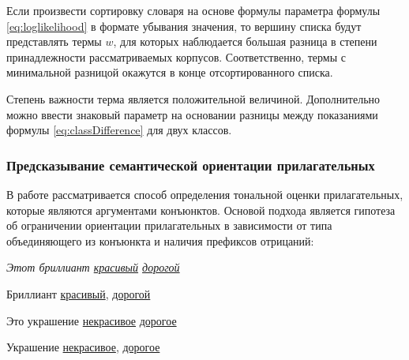         Если произвести сортировку словаря на основе формулы параметра формулы
        \ref{eq:loglikelihood} в формате убывания значения, то вершину списка
        будут представлять термы $w$, для которых наблюдается большая разница в
        степени принадлежности рассматриваемых корпусов. Соответственно, термы
        с минимальной разницой окажутся в конце отсортированного списка.

        Степень важности терма является положительной величиной. Дополнительно можно
        ввести знаковый параметр на основании разницы между показаниями формулы
        \ref{eq:classDifference} для двух классов.

        \subsubsection{Предсказывание семантической ориентации прилагательных}
        \label{sec:adjectivesPrediction}
        В работе \cite{lexiconAdjectives} рассматривается способ определения
        тональной оценки прилагательных, которые являются аргументами конъюнктов.
        Основой подхода является гипотеза об ограничении ориентации прилагательных
        в зависимости от типа объединяющего из конъюнкта и наличия префиксов отрицаний:
        \begin{center}
            \it
            Этот бриллиант \underline{красивый} {} \underline{дорогой}

            Бриллиант \underline{красивый}, {} \underline{дорогой}

            Это украшение \underline{некрасивое} {} \underline{дорогое}

            Украшение \underline{некрасивое}, {} \underline{дорогое}
        \end{center}

